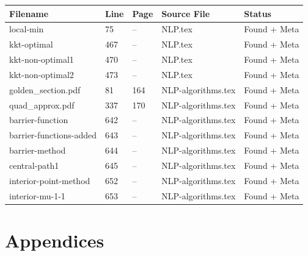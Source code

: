 \documentclass[11pt]{article}
\begin{document}
\begin{longtable}{|p{3.5cm}|p{1.5cm}|p{1cm}|p{4cm}|p{2cm}|}
\hline
\textbf{Filename} & \textbf{Line} & \textbf{Page} & \textbf{Source File} & \textbf{Status} \\
\hline
\endhead

local-min & 75 & -- & NLP.tex & \textcolor{found}{Found + Meta} \\
\hline

kkt-optimal & 467 & -- & NLP.tex & \textcolor{found}{Found + Meta} \\
\hline

kkt-non-optimal1 & 470 & -- & NLP.tex & \textcolor{found}{Found + Meta} \\
\hline

kkt-non-optimal2 & 473 & -- & NLP.tex & \textcolor{found}{Found + Meta} \\
\hline

golden\_section.pdf & 81 & 164 & NLP-algorithms.tex & \textcolor{found}{Found + Meta} \\
\hline

quad\_approx.pdf & 337 & 170 & NLP-algorithms.tex & \textcolor{found}{Found + Meta} \\
\hline

barrier-function & 642 & -- & NLP-algorithms.tex & \textcolor{found}{Found + Meta} \\
\hline

barrier-functions-added & 643 & -- & NLP-algorithms.tex & \textcolor{found}{Found + Meta} \\
\hline

barrier-method & 644 & -- & NLP-algorithms.tex & \textcolor{found}{Found + Meta} \\
\hline

central-path1 & 645 & -- & NLP-algorithms.tex & \textcolor{found}{Found + Meta} \\
\hline

interior-point-method & 652 & -- & NLP-algorithms.tex & \textcolor{found}{Found + Meta} \\
\hline

interior-mu-1-1 & 653 & -- & NLP-algorithms.tex & \textcolor{found}{Found + Meta} \\
\hline

\end{longtable}


\section{Appendices}
\end{document}
